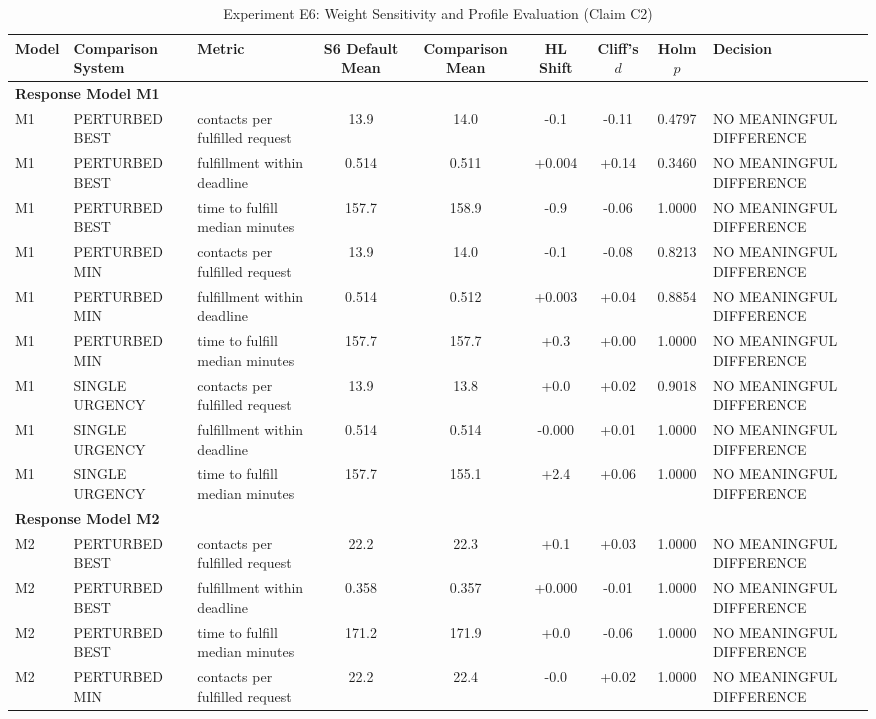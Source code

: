 \begin{table}[t]
\centering
\small
\caption{Experiment E6: Weight Sensitivity and Profile Evaluation (Claim C2)}
\label{tab:e6_sensitivity}
\begin{tabular}{lllcccccl}
\toprule
Model & Comparison System & Metric & S6 Default Mean & Comparison Mean & HL Shift & Cliff's $d$ & Holm $p$ & Decision \\
\midrule
\multicolumn{9}{l}{\textbf{Response Model M1}} \\
\midrule
M1 & PERTURBED BEST & contacts per fulfilled request & 13.9 & 14.0 & -0.1 & -0.11 & 0.4797 & NO MEANINGFUL DIFFERENCE \\
M1 & PERTURBED BEST & fulfillment within deadline & 0.514 & 0.511 & +0.004 & +0.14 & 0.3460 & NO MEANINGFUL DIFFERENCE \\
M1 & PERTURBED BEST & time to fulfill median minutes & 157.7 & 158.9 & -0.9 & -0.06 & 1.0000 & NO MEANINGFUL DIFFERENCE \\
M1 & PERTURBED MIN & contacts per fulfilled request & 13.9 & 14.0 & -0.1 & -0.08 & 0.8213 & NO MEANINGFUL DIFFERENCE \\
M1 & PERTURBED MIN & fulfillment within deadline & 0.514 & 0.512 & +0.003 & +0.04 & 0.8854 & NO MEANINGFUL DIFFERENCE \\
M1 & PERTURBED MIN & time to fulfill median minutes & 157.7 & 157.7 & +0.3 & +0.00 & 1.0000 & NO MEANINGFUL DIFFERENCE \\
M1 & SINGLE URGENCY & contacts per fulfilled request & 13.9 & 13.8 & +0.0 & +0.02 & 0.9018 & NO MEANINGFUL DIFFERENCE \\
M1 & SINGLE URGENCY & fulfillment within deadline & 0.514 & 0.514 & -0.000 & +0.01 & 1.0000 & NO MEANINGFUL DIFFERENCE \\
M1 & SINGLE URGENCY & time to fulfill median minutes & 157.7 & 155.1 & +2.4 & +0.06 & 1.0000 & NO MEANINGFUL DIFFERENCE \\
\midrule
\multicolumn{9}{l}{\textbf{Response Model M2}} \\
\midrule
M2 & PERTURBED BEST & contacts per fulfilled request & 22.2 & 22.3 & +0.1 & +0.03 & 1.0000 & NO MEANINGFUL DIFFERENCE \\
M2 & PERTURBED BEST & fulfillment within deadline & 0.358 & 0.357 & +0.000 & -0.01 & 1.0000 & NO MEANINGFUL DIFFERENCE \\
M2 & PERTURBED BEST & time to fulfill median minutes & 171.2 & 171.9 & +0.0 & -0.06 & 1.0000 & NO MEANINGFUL DIFFERENCE \\
M2 & PERTURBED MIN & contacts per fulfilled request & 22.2 & 22.4 & -0.0 & +0.02 & 1.0000 & NO MEANINGFUL DIFFERENCE \\

\end{tabular}
\end{table}
